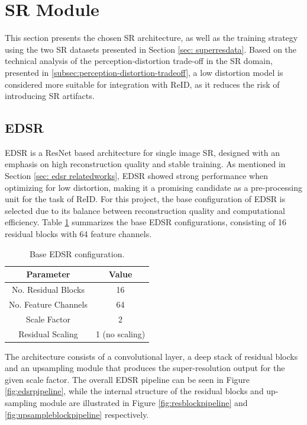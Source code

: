 \section{SR Module}\label{sec:designSRmodule}
This section presents the chosen \acs{SR} architecture, as well as the training strategy using the two \acs{SR} datasets presented in Section \ref{sec: superresdata}. Based on the technical analysis of the perception-distortion trade-off in the \acs{SR} domain, presented in \ref{subsec:perception-distortion-tradeoff}, a low distortion model is considered more suitable for integration with \acs{ReID}, as it reduces the risk of introducing \acs{SR} artifacts.

\subsection{EDSR}
\acf{EDSR} is a \acf{ResNet} based architecture for single image \acs{SR}, designed with an emphasis on high reconstruction quality and stable training. As mentioned in Section \ref{sec: edsr relatedworks}, \acs{EDSR} showed strong performance when optimizing for low distortion, making it a promising candidate as a pre-processing unit for the task of \acs{ReID}. For this project, the base configuration of \acs{EDSR} is selected due to its balance between reconstruction quality and computational efficiency. Table \ref{tab:edsr-config} summarizes the base \acs{EDSR} configurations, consisting of 16 residual blocks with 64 feature channels.

\begin{table}[H]
    \centering
    \begin{tabular}{|c|c|}\hline
        \cellcolor[HTML]{D8E9F7} \textbf{Parameter} & \cellcolor[HTML]{D8E9F7} \textbf{Value} \\\hline
        No. Residual Blocks & 16 \\\hline
        No. Feature Channels & 64 \\\hline
        Scale Factor & 2 \\\hline
        Residual Scaling & 1 (no scaling) \\\hline
    \end{tabular}
    \caption{Base \acs{EDSR} configuration.}
    \label{tab:edsr-config}
\end{table}

\noindent The architecture consists of a convolutional layer, a deep stack of residual blocks and an upsampling module that produces the super-resolution output for the given scale factor. The overall \acs{EDSR} pipeline can be seen in Figure \ref{fig:edsrpipeline}, while the internal structure of the residual blocks and up-sampling module are illustrated in Figure \ref{fig:resblockpipeline} and \ref{fig:upsampleblockpipeline} respectively. 

